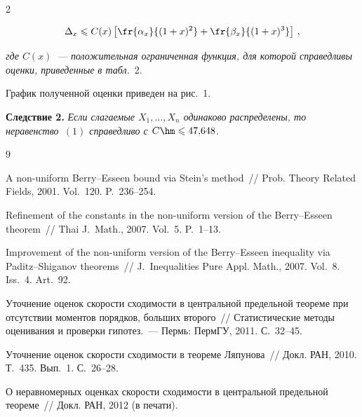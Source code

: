 \begin{multicols}{2}

\noindent
$$
\Delta_x\leqslant
C(x)\left[\fr{\alpha_x}{(1+x)^2}+\fr{\beta_x}{(1+x)^3}\right]\,,
$$

\noindent
\textit{где $C(x)$~--- положительная ограниченная функция, для которой
справедливы оценки, приведенные в табл.}~2.


\smallskip

График полученной оценки приведен на рис.~1.

\smallskip

\noindent
\textbf{Следствие 2.} \textit{Если слагаемые $X_1,\ldots,X_n$ одинаково распределены, то
неравенство~$(1)$ справедливо с $C\hm\leqslant 47{,}648$.
}


{\small\frenchspacing
{%
\begin{thebibliography}{9}


 A non-uniform Berry--Esseen bound
via Stein's method~// Prob. Theory Related Fields, 2001.
Vol.~120. P.~236--254.

 Refinement of the constants in the
non-uniform version of the Berry--Esseen theorem~// Thai J.~Math., 2007. Vol.~5. P.~1--13.

 Improvement of the non-uniform
version of the Berry--Esseen inequality via Paditz--Shiganov
theorems~// J.~Inequalities Pure Appl.
Math., 2007. Vol.~8. Iss.~4. Art.~92.

 Уточнение оценок ско\-рости
сходимости в центральной предельной теореме при отсутствии моментов
порядков, больших второго~// Статистические методы оценивания и
проверки гипотез.~--- Пермь: ПермГУ, 2011. С.~32--45.

 Уточнение оценок скорости схо\-ди\-мости в теореме
Ляпунова~// Докл. РАН, 2010. Т.~435. Вып.~1. С.~26--28.

\label{end\stat}
 О неравномерных оценках
скорости сходимости в центральной предельной теореме~// Докл.
РАН, 2012 (в печати).

 \end{thebibliography}
}
}


\end{multicols}       
